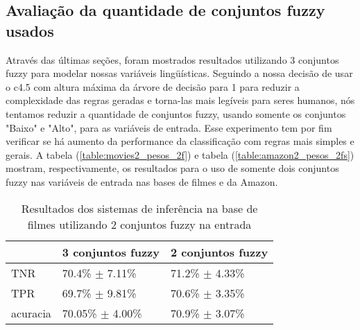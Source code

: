\documentclass[template.tex]{subfiles}
\begin{document}
\subsection{Avaliação da quantidade de conjuntos fuzzy usados}

Através das últimas seções, foram mostrados resultados utilizando 3 conjuntos fuzzy para modelar nossas variáveis lingüísticas. Seguindo a nossa decisão de usar o c4.5 com altura máxima da árvore de decisão para 1 para reduzir a complexidade das regras geradas e torna-las mais legíveis para seres humanos, nós tentamos reduzir a quantidade de conjuntos fuzzy, usando somente os conjuntos "Baixo" e "Alto", para as variáveis de entrada. Esse experimento tem por fim verificar se há aumento da performance da classificação com regras mais simples e gerais. A tabela (\ref{table:movies2_pesos_2f}) e tabela (\ref{table:amazon2_pesos_2fs}) mostram, respectivamente, os resultados para o uso de somente dois conjuntos fuzzy nas variáveis de entrada nas bases de filmes e da Amazon.

\begin{table}[!h]
    \begin{tabular}{lll}
    ~                   & 3 conjuntos fuzzy                             & 2 conjuntos fuzzy \\ \hline
    TNR                 & 70.4\% $\pm$ 7.11\%                   & 71.2\% $\pm$ 4.33\%    \\
    TPR             & 69.7\% $\pm$ 9.81\%                   & 70.6\% $\pm$ 3.35\%   \\
    acuracia        & 70.05\% $\pm$ 4.00\%              & 70.9\% $\pm$ 3.07\%    \\
    \end{tabular}
    \caption{Resultados dos sistemas de inferência na base de filmes utilizando 2 conjuntos fuzzy na entrada}
    \label{table:movies2_pesos_2fs}
\end{table}


%
%
%
\end{document}
